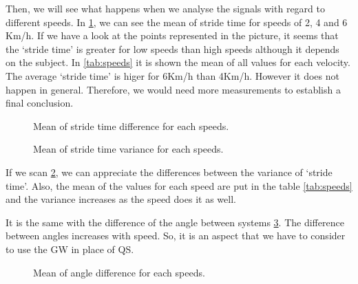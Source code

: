 Then, we will see what happens when we analyse the signals with regard to different speeds. In \ref{fig:speed_stride_time}, we can see the mean of stride time for speeds of 2, 4 and 6 Km/h. If we have a look at the points represented in the picture, it seems that the ‘stride time’ is greater for low speeds than high speeds although it depends on the subject. In \ref{tab:speeds} it is shown the mean of all values for each velocity. The average ‘stride time’ is higer for 6Km/h than 4Km/h. However it does not happen in general. Therefore, we would need more measurements to establish a final conclusion.

\begin{figure}[H]
	\centering
	\caption{Mean of stride time difference for each speeds.}
	\label{fig:speed_stride_time}
\end{figure}

\begin{figure}[H]
	\centering
	\caption{Mean of stride time variance for each speeds.}
	\label{fig:speed_var_stride_time}
\end{figure}

If we scan \ref{fig:speed_var_stride_time}, we can appreciate the differences between the variance of ‘stride time’. Also, the mean of the values for each speed are put in the table \ref{tab:speeds} and the variance increases as the speed does it as well.

It is the same with the difference of the angle between systems \ref{fig:speed_angle}. The difference between angles increases with speed. So, it is an aspect that we have to consider to use the GW in place of QS.

\begin{figure}[H]
	\centering
	\caption{Mean of angle difference for each speeds.}
	\label{fig:speed_angle}
\end{figure}


